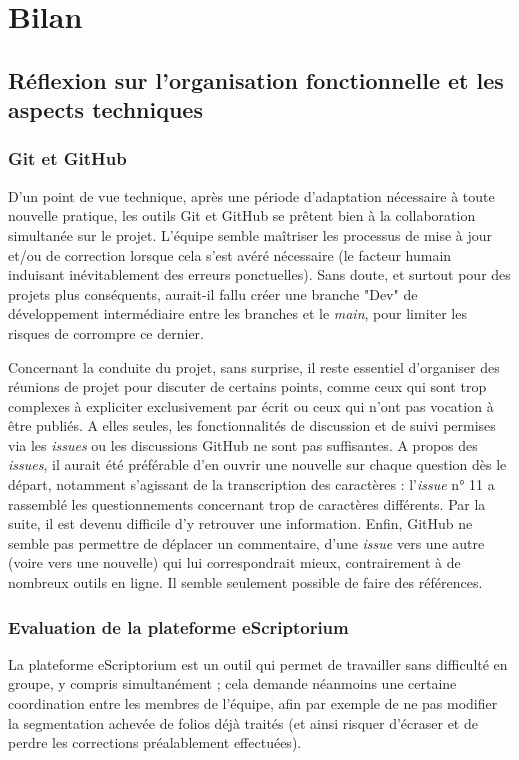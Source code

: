 \documentclass{article}
\begin{document}
	\section{Bilan}
	
	\subsection{Réflexion sur l'organisation fonctionnelle et les aspects techniques}
	\subsubsection{Git et GitHub}
	D'un point de vue technique, après une période d'adaptation nécessaire à toute nouvelle pratique, les outils Git et GitHub se prêtent bien à la collaboration simultanée sur le projet. L'équipe semble maîtriser les processus de mise à jour et/ou de correction lorsque cela s'est avéré nécessaire (le facteur humain induisant inévitablement des erreurs ponctuelles). Sans doute, et surtout pour des projets plus conséquents, aurait-il fallu créer une branche "Dev" de développement intermédiaire entre les branches et le  \textit{main}, pour limiter les risques de corrompre ce dernier.
	
	
	Concernant la conduite du projet, sans surprise, il reste essentiel d'organiser des réunions de projet pour discuter de certains points, comme ceux qui sont trop complexes à expliciter exclusivement par écrit ou ceux qui n'ont pas vocation à être publiés. A elles seules, les fonctionnalités de discussion et de suivi permises via les \textit{issues} ou les discussions GitHub ne sont pas suffisantes.
	A propos des \textit{issues}, il aurait été préférable d'en ouvrir une nouvelle sur chaque question dès le départ, notamment s'agissant de la transcription des caractères : l'\textit{issue} n° 11 a rassemblé les questionnements concernant trop de caractères différents. Par la suite, il est devenu difficile d'y retrouver une information. Enfin, GitHub ne semble pas permettre de déplacer un commentaire, d'une \textit{issue} vers une autre (voire vers une nouvelle) qui lui correspondrait mieux, contrairement à de nombreux outils en ligne. Il semble seulement possible de faire des références.
	
	
	\subsubsection{Evaluation de la plateforme eScriptorium}
	
	La plateforme eScriptorium est un outil qui permet de travailler sans difficulté en groupe, y compris simultanément ; cela demande néanmoins une certaine coordination entre les membres de l'équipe, afin par exemple de ne pas modifier la segmentation achevée de folios déjà traités (et ainsi risquer d'écraser et de perdre les corrections préalablement effectuées).
	
\end{document}

